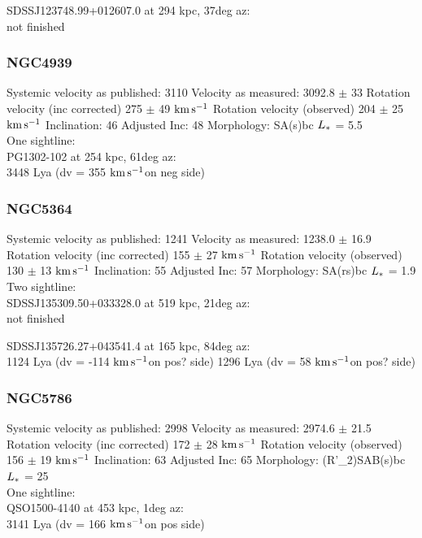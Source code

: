 \documentclass[iop]{emulateapj-rtx4}
\newcommand{\kms}{$\rm km\, s^{-1}$}
\begin{document}
SDSSJ123748.99+012607.0 at  294 kpc, 37deg az: \\
not finished


\subsubsection{NGC4939}
Systemic velocity as published: 3110
Velocity as measured: 3092.8 $\pm$ 33
Rotation velocity (inc corrected) 275 $\pm$ 49 \kms
Rotation velocity (observed) 204 $\pm$ 25 \kms
Inclination: 46
Adjusted Inc: 48
Morphology: SA(s)bc
$L_{\**}$ = 5.5 \\

One sightline: \\
PG1302-102 at 254 kpc, 61deg az: \\
3448 Lya (dv = 355 \kms on neg side)



\subsubsection{NGC5364}
Systemic velocity as published: 1241
Velocity as measured: 1238.0 $\pm$ 16.9
Rotation velocity (inc corrected) 155 $\pm$ 27 \kms
Rotation velocity (observed) 130 $\pm$ 13 \kms
Inclination: 55
Adjusted Inc: 57
Morphology: SA(rs)bc
$L_{\**}$ = 1.9 \\

Two sightline: \\
SDSSJ135309.50+033328.0 at 519 kpc, 21deg az: \\
not finished

SDSSJ135726.27+043541.4 at 165 kpc, 84deg az: \\
1124 Lya (dv = -114 \kms on pos? side)
1296 Lya (dv = 58 \kms on pos? side)



\subsubsection{NGC5786}
Systemic velocity as published: 2998
Velocity as measured: 2974.6 $\pm$ 21.5
Rotation velocity (inc corrected) 172 $\pm$ 28 \kms
Rotation velocity (observed) 156 $\pm$ 19 \kms
Inclination: 63
Adjusted Inc: 65
Morphology: (R'\_2)SAB(s)bc
$L_{\**}$ = 25 \\

One sightline: \\
QSO1500-4140 at 453 kpc, 1deg az: \\
3141 Lya (dv = 166 \kms on pos side)
\end{document}
